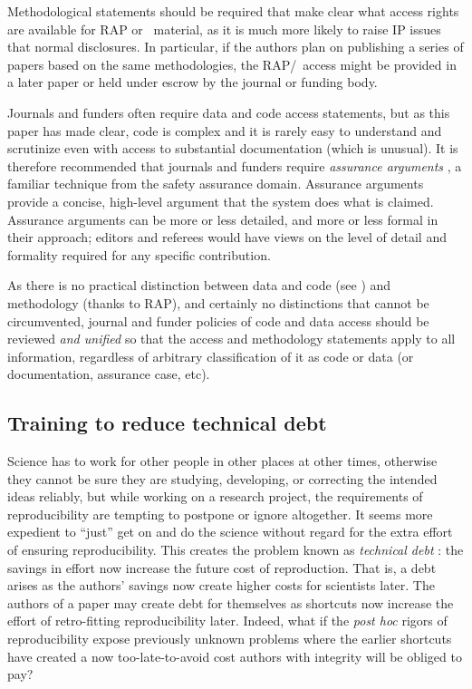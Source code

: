 \documentclass{comjnl}
\begin{document}
Methodological statements should be required that make clear what access rights are available for RAP or \RAPstar\ material, as it is much more likely to raise IP issues that normal disclosures. In particular, if the authors plan on publishing a series of papers based on the same methodologies, the RAP/\RAPstar\ access might be provided in a later paper or held under escrow by the journal or funding body.

Journals and funders often require data and code access statements, but as this paper has made clear, code is complex and it is rarely easy to understand and scrutinize even with access to substantial documentation (which is unusual). It is therefore recommended that journals and funders require \emph{assurance arguments} \cite{assurance-case}, a familiar technique from the safety assurance domain. Assurance arguments provide a concise, high-level argument that the system does what is claimed. Assurance arguments can be more or less detailed, and more or less formal in their approach; editors and referees would have views on the level of detail and formality required for any specific contribution.

As there is no practical distinction between data and code (see \supplement) and methodology (thanks to RAP), and certainly no distinctions that cannot be circumvented, journal and funder policies of code and data access should be reviewed \emph{and unified\/} so that the access and methodology statements apply to all information, regardless of arbitrary classification of it as code or data (or documentation, assurance case, etc).

\subsection{Training to reduce technical debt}\label{technical-debt}
Science has to work for other people in other places at other times, otherwise they cannot be sure they are studying, developing, or correcting the intended ideas reliably, but while working on a research project, the requirements of reproducibility are tempting to postpone or ignore altogether. It seems more expedient to ``just'' get on and do the science without regard for the extra effort of ensuring reproducibility. This creates the problem known as \emph{technical debt} \cite{debt}: the savings in effort now increase the future cost of reproduction. That is, a debt arises as the authors' savings now create higher costs for scientists later. The authors of a paper may create debt for themselves as shortcuts now increase the effort of retro-fitting reproducibility later. Indeed, what if the \emph{post hoc\/} rigors of reproducibility expose previously unknown problems where the earlier shortcuts have created a now too-late-to-avoid cost authors with integrity will be obliged to pay?
\end{document}
